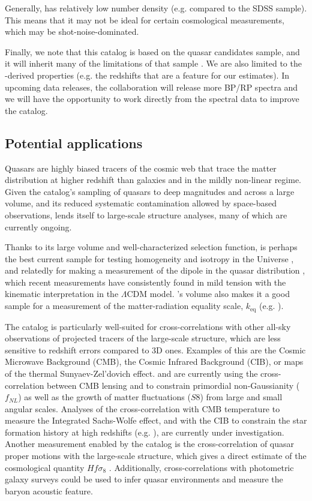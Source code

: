 Generally, \cat has relatively low number density (e.g. compared to the SDSS sample). 
This means that it may not be ideal for certain cosmological measurements, which may be shot-noise-dominated. 

Finally, we note that this catalog is based on the \Gaia quasar candidates sample, and it will inherit many of the limitations of that sample \citep{gaia_collaboration_gaia_2023}.
We are also limited to the \Gaia-derived properties (e.g. the \Gaia redshifts that are a feature for our estimates).
In upcoming \Gaia data releases, the collaboration will release more BP/RP spectra and we will have the opportunity to work directly from the spectral data to improve the catalog.


\subsection{Potential applications}
\label{sec:applications}

Quasars are highly biased tracers of the cosmic web that trace the matter distribution at higher redshift than galaxies and in the mildly non-linear regime. 
Given the \cat catalog's sampling of quasars to deep magnitudes and across a large volume, and its reduced systematic contamination allowed by space-based observations, \cat lends itself to large-scale structure analyses, many of which are currently ongoing.

Thanks to its large volume and well-characterized selection function, \cat is perhaps the best current sample for testing homogeneity and isotropy in the Universe \citep{quaia-homogeneity}, and relatedly for making a measurement of the dipole in the quasar distribution \citep{quaia-isotropy}, which recent measurements have consistently found in mild tension with the kinematic interpretation in the $\Lambda$CDM model.
\cat's volume also makes it a good sample for a measurement of the matter-radiation equality scale, $k_\text{eq}$ (e.g. \citealt{bahr-kalus_measurement_2023}).

The catalog is particularly well-suited for cross-correlations with other all-sky observations of projected tracers of the large-scale structure, which are less sensitive to redshift errors compared to 3D ones. 
Examples of this are the Cosmic Microwave Background (CMB), the Cosmic Infrared Background (CIB), or maps of the thermal Sunyaev-Zel'dovich effect. 
\cite{quaia-fnl} and \cite{quaia-s8} are currently using  the cross-correlation between CMB lensing and \cat to constrain primordial non-Gaussianity ($f_{NL}$) as well as the growth of matter fluctuations ($S8$) from large and small angular scales. 
Analyses of the cross-correlation with CMB temperature to measure the Integrated Sachs-Wolfe effect, and with the CIB to constrain the star formation history at high redshifts (e.g. \citealt{jego_star_2023}), are currently under investigation.
Another measurement enabled by the catalog is the cross-correlation of quasar proper motions with the large-scale structure, which gives a direct estimate of the cosmological quantity $H f \sigma_8$ \citep{duncan_can_2023}.
Additionally, cross-correlations with photometric galaxy surveys could be used to infer quasar environments and measure the baryon acoustic feature. 


